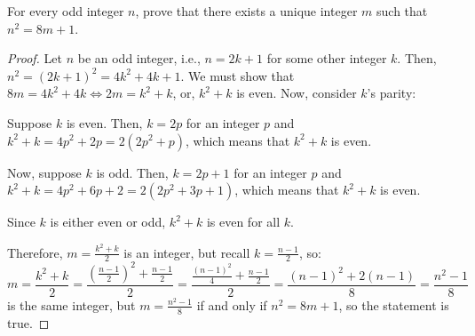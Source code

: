 \question For every odd integer $n$, prove that there exists a unique integer $m$ such that $n^2 = 8m + 1$.
\begin{proof}
  Let $n$ be an odd integer, i.e., $n = 2k+1$ for some other integer $k$.
  Then, $n^2 = (2k+1)^2 = 4k^2 + 4k + 1$.
  We must show that $8m = 4k^2 + 4k \iff 2m = k^2 + k$, or, $k^2 + k$ is even.
  Now, consider $k$'s parity:

  Suppose $k$ is even.
  Then, $k = 2p$ for an integer $p$ and $k^2 + k = 4p^2 + 2p = 2(2p^2 + p)$,
  which means that $k^2+k$ is even.

  Now, suppose $k$ is odd.
  Then, $k = 2p+1$ for an integer $p$ and $k^2 + k = 4p^2 + 6p + 2 = 2(2p^2 + 3p + 1)$,
  which means that $k^2+k$ is even.

  Since $k$ is either even or odd, $k^2 + k$ is even for all $k$.

  Therefore, $m = \frac{k^2+k}{2}$ is an integer, but recall $k = \frac{n-1}{2}$, so:
  \begin{equation*}
    m = \frac{k^2+k}{2}
    = \frac{\left(\frac{n-1}{2}\right)^2+\frac{n-1}{2}}{2}
    = \frac{\frac{(n-1)^2}{4}+\frac{n-1}{2}}{2}
    = \frac{(n-1)^2 + 2(n-1)}{8}
    = \frac{n^2-1}{8}
  \end{equation*}
  is the same integer, but $m = \frac{n^2-1}{8}$ if and only if $n^2 = 8m + 1$, so the statement is true.
\end{proof}


